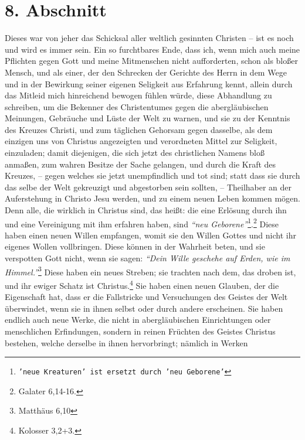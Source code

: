 \section{8. Abschnitt} \label{kap1_ab8}

Dieses war von jeher das Schicksal aller weltlich gesinnten Christen -- ist es
noch und wird es immer sein.
Ein so furchtbares Ende, dass ich, wenn mich auch meine Pflichten gegen Gott und
meine Mitmenschen nicht aufforderten, schon als bloßer Mensch, und als einer,
der den Schrecken der Gerichte des Herrn in dem Wege und in der Bewirkung seiner
eigenen Seligkeit aus Erfahrung kennt, allein durch das Mitleid mich hinreichend
bewogen fühlen würde, diese Abhandlung zu schreiben, um die Bekenner des
Christentumes gegen die abergläubischen Meinungen, Gebräuche und Lüste der Welt
zu warnen, und sie zu der Kenntnis des Kreuzes Christi, und zum täglichen
Gehorsam gegen dasselbe, als dem einzigen uns von Christus angezeigten und
verordneten Mittel zur Seligkeit, einzuladen;
damit diejenigen, die sich jetzt des christlichen Namens bloß anmaßen, zum
wahren Besitze der Sache gelangen, und durch die Kraft des Kreuzes,
-- gegen welches sie jetzt unempfindlich und tot sind;
statt dass sie durch das selbe der Welt gekreuzigt und abgestorben sein sollten,
-- Theilhaber an der Auferstehung in Christo Jesu werden, und zu einem neuen
Leben kommen mögen.
Denn alle, die wirklich in Christus sind, das heißt:
die eine Erlösung durch ihn und eine Vereinigung mit ihm erfahren haben, sind
\textit{"`neu Geborene"'}\footnote{\texttt{'neue Kreaturen' ist ersetzt durch 'neu Geborene'}}.\footnote{Galater 6,14-16.}
Diese haben einen neuen Willen empfangen, womit sie den Willen Gottes und nicht
ihr eigenes Wollen vollbringen.
Diese können in der Wahrheit beten, und sie verspotten Gott nicht, wenn sie
sagen:
\textit{"`Dein Wille geschehe auf Erden, wie im Himmel."'}\footnote{Matthäus 6,10}
Diese haben ein neues Streben;
sie trachten nach dem, das droben ist, und ihr ewiger Schatz ist
Christus.\footnote{Kolosser 3,2+3.}
Sie haben einen neuen Glauben, der die Eigenschaft hat, dass er die Fallstricke
und Versuchungen des Geistes der Welt überwindet, wenn sie in ihnen selbst oder
durch andere erscheinen.
Sie haben endlich auch neue Werke, die nicht in abergläubischen Einrichtungen
oder menschlichen Erfindungen, sondern in reinen Früchten des Geistes Christus
 bestehen, welche derselbe in ihnen hervorbringt;
nämlich in Werken
